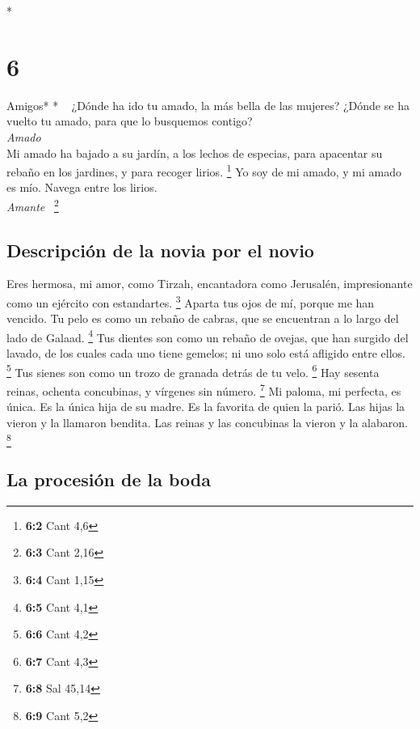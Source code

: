 \begin{paracol}{2}
\begin{otherlanguage}{english}
\end{otherlanguage}

\switchcolumn[0]*

\hypertarget{section-10}{%
\section{6}\label{section-10}}

\emph{\hfill\break
}Amigos* * ~ ¿Dónde ha ido tu amado, la más bella de las
mujeres? ¿Dónde se ha vuelto tu amado, para que lo busquemos contigo?\\
\emph{Amado}\\
 Mi amado ha bajado a su jardín, a los lechos de especias,
para apacentar su rebaño en los jardines, y para recoger lirios.
\footnote{\textbf{6:2} Cant 4,6}  Yo soy de mi amado, y mi
amado es mío. Navega entre los lirios.\\
\emph{Amante} ~\footnote{\textbf{6:3} Cant 2,16}

\hypertarget{descripciuxf3n-de-la-novia-por-el-novio-1}{%
\subsection{Descripción de la novia por el
novio}\label{descripciuxf3n-de-la-novia-por-el-novio-1}}

 Eres hermosa, mi amor, como Tirzah, encantadora como
Jerusalén, impresionante como un ejército con estandartes. \footnote{\textbf{6:4}
  Cant 1,15}  Aparta tus ojos de mí, porque me han
vencido. Tu pelo es como un rebaño de cabras, que se encuentran a lo
largo del lado de Galaad. \footnote{\textbf{6:5} Cant 4,1}
 Tus dientes son como un rebaño de ovejas, que han surgido
del lavado, de los cuales cada uno tiene gemelos; ni uno solo está
afligido entre ellos. \footnote{\textbf{6:6} Cant 4,2} 
Tus sienes son como un trozo de granada detrás de tu velo. \footnote{\textbf{6:7}
  Cant 4,3}  Hay sesenta reinas, ochenta concubinas, y
vírgenes sin número. \footnote{\textbf{6:8} Sal 45,14}  Mi
paloma, mi perfecta, es única. Es la única hija de su madre. Es la
favorita de quien la parió. Las hijas la vieron y la llamaron bendita.
Las reinas y las concubinas la vieron y la alabaron. \footnote{\textbf{6:9}
  Cant 5,2}

\hypertarget{la-procesiuxf3n-de-la-boda}{%
\subsection{La procesión de la boda}\label{la-procesiuxf3n-de-la-boda}}


\end{paracol}

